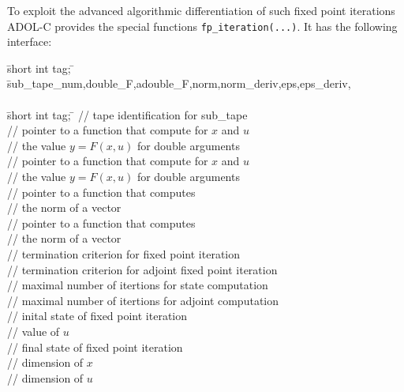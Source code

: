 \documentclass[11pt,twoside]{article}
\begin{document}
To exploit the advanced algorithmic differentiation  of such fixed point iterations
ADOL-C provides the special functions {\tt fp\_iteration(...)}.
It has the following interface: 
\begin{tabbing}
\hspace{0.5in}\={\sf short int tag;} \hspace{1.1in}\= \kill    %
\={\sf sub\_tape\_num,double\_F,adouble\_F,norm,norm\_deriv,eps,eps\_deriv,}\\
\>              \\
\hspace{0.5in}\={\sf short int tag;} \hspace{0.9in}\= \kill    %
         \> // tape identification for sub\_tape \\
         \> // pointer to a function that compute for $x$ and $u$ \\
\>                              \> // the value $y=F(x,u)$ for {\sf double} arguments\\             
        \> // pointer to a function that compute for $x$ and $u$ \\
\>                              \> // the value $y=F(x,u)$ for {\sf double} arguments\\             
              \> // pointer to a function that computes\\
\>                              \> // the norm of a vector\\
       \> // pointer to a function that computes\\
\>                              \> // the norm of a vector\\
             \> // termination criterion for fixed point iteration\\
      \> // termination criterion for adjoint fixed point iteration\\
                 \> // maximal number of itertions for state computation\\
          \> // maximal number of itertions for adjoint computation\\
          \> // inital state of fixed point iteration\\
             \> // value of $u$\\
        \> // final state of fixed point iteration\\
             \> // dimension of $x$\\
             \> // dimension of $u$\\
\end{tabbing}
\end{document}
